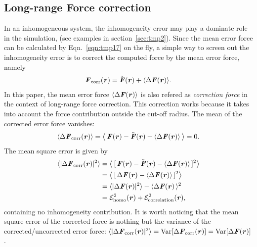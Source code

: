 \documentclass[aps,pre,preprint]{revtex4-1}
\renewcommand{\v}[1]{\textbf{\textit{#1}}}
\renewcommand{\d}[1]{\textsf{#1}}
\begin{document}

\subsection{Long-range Force correction}

In an inhomogeneous system, the inhomogeneity error may play a
dominate role in the simulation, (see examples in section~\ref{sec:tmp2}).
Since the mean error force can be calculated
by Eqn.~\eqref{eqn:tmp17} on the fly, a simple way to screen out the
inhomogeneity error is to correct the computed force by the mean error
force, namely
\begin{align}\label{eqn:define-fcorr}
  \v F_{\textrm{corr}}(\v r) = \tilde{\v F}(\v r) + \langle\Delta\v F(\v r)\rangle.
\end{align}
In this paper, the mean error force $\langle\Delta\v F(\v r)\rangle$
is also refered as \emph{correction force} in the context of
long-range force correction. This correction works because it takes
into account the force contribution outside the cut-off radius. The mean of
the corrected error force vanishes:
\begin{align}\label{eqn:mean-fcorr}
  \langle\Delta\v F_{\textrm{corr}}(\v r)\rangle
   =
  \big\langle\,
  \v F(\v r) - \tilde{\v F}(\v r) - \langle\Delta\v F(\v r)\rangle\,
  \big\rangle = 0.
\end{align}
The mean square error is given by
\begin{align} \nonumber
  \langle\vert\Delta\v F_{\textrm{corr}}(\v r)\vert^2\rangle
  & =
  \big\langle\,
  [\,\v F(\v r) - \tilde{\v F}(\v r) - \langle\Delta\v F(\v r)\rangle\,]^2
  \big\rangle \\\nonumber
  & =
  \big\langle\,
  [\,\Delta\v F(\v r) - \langle\Delta\v F(\v r)\rangle\,]^2
  \big\rangle \\\nonumber
  & =
  \langle\vert\Delta\v F(\v r)\vert^2\rangle -
  \langle\Delta\v F(\v r)\,\rangle^2 \\
  & =
  \mathcal E^2_{\textrm{homo}}(\v r) +
  \mathcal E^2_{\textrm{correlation}}(\v r),
\end{align}
containing no inhomogeneity contribution.  It is worth noticing that the mean
square error of the corrected force is nothing but the variance of the
corrected/uncorrected error force: $\langle\vert\Delta\v
F_{\textrm{corr}}(\v r)\vert^2\rangle = \textrm{Var}[\Delta\v
F_{\textrm{corr}}(\v r)] = \textrm{Var}[\Delta\v F(\v r)]$.
\end{document}
